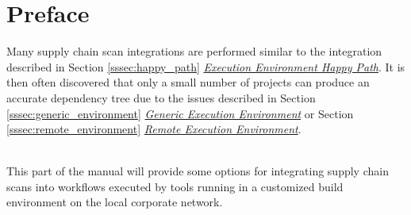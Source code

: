 
\section*{Preface}

Many supply chain scan integrations are performed similar to the integration
described in Section \ref{sssec:happy_path}
\hyperref[sssec:happy_path]{\textit{Execution Environment Happy Path}}. It
is then often discovered that only a small number of projects can produce
an accurate dependency tree due to the issues described in Section
\ref{sssec:generic_environment}
\hyperref[sssec:generic_environment]{\textit{Generic Execution Environment}} or
Section \ref{sssec:remote_environment}
\hyperref[sssec:remote_environment]{\textit{Remote Execution Environment}}.

\noindent\\This part of the manual will provide some options for integrating
supply chain scans into workflows executed by tools running
in a customized build environment on the local corporate network.

\newcommand{\scaresolver}{\href{https://checkmarx.com/resource/documents/en/34965-19196-checkmarx-sca-resolver.html}{\textbf{SCA Resolver}}\xspace}
\newcommand{\cxflow}{\href{https://github.com/checkmarx-ltd/cx-flow}{\textbf{CxFlow}}\xspace}
\newcommand{\cxonecli}{\href{https://checkmarx.com/resource/documents/en/34965-68620-checkmarx-one-cli-tool.html}{\textbf{CxOne CLI}}\xspace}
\newcommand{\cxone}{\href{https://checkmarx.com/resource/documents/en/34965-68517-checkmarx-one-user-guide.html}{\textbf{Checkmarx One}}\xspace}
\newcommand{\cxsca}{\href{https://checkmarx.com/resource/documents/en/34965-18662-checkmarx-sca.html}{\textbf{Checkmarx SCA}}\xspace}

\newcommand{\cxtoolkit}{\href{https://github.com/checkmarx-ts/cx-supply-chain-toolkit}{\textbf{Checkmarx Supply Chain Toolkit}}\xspace}
\newcommand{\cxtoolkitpath}[2]{\href{https://github.com/checkmarx-ts/cx-supply-chain-toolkit/#1}{\textbf{Checkmarx Supply Chain Toolkit #2}\xspace}}





